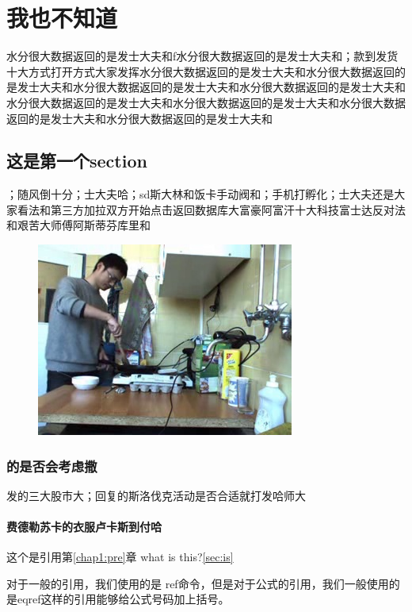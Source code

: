 \chapter{我也不知道}\label{chap2:idk}


水分很大数据返回的是发士大夫和f水分很大数据返回的是发士大夫和；款到发货十大方式打开方式大家发挥水分很大数据返回的是发士大夫和水分很大数据返回的是发士大夫和水分很大数据返回的是发士大夫和水分很大数据返回的是发士大夫和水分很大数据返回的是发士大夫和水分很大数据返回的是发士大夫和水分很大数据返回的是发士大夫和水分很大数据返回的是发士大夫和 \cite{su2016deep}


\section{这是第一个section}
；随风倒十分；士大夫哈；sd斯大林和饭卡手动阀和；手机打孵化；士大夫还是大家看法和第三方加拉双方开始点击返回数据库大富豪阿富汗十大科技富士达反对法和艰苦大师傅阿斯蒂芬库里和
\zhlipsum[2-3]
\begin{figure}[ht]
\centering
\includegraphics[scale=0.5]{img/example.jpg}
\label{fig1}
\end{figure}
\zhlipsum[4-5]
\subsection{的是否会考虑撒}
发的三大股市大；回复的斯洛伐克活动是否合适就打发哈师大\cite{wang2013intelligent}

\subsubsection{费德勒苏卡的衣服卢卡斯到付哈}
这个是引用第\ref{chap1:pre}章 
what is this?\ref{sec:is}

对于一般的引用，我们使用的是 ref命令，但是对于公式的引用，我们一般使用的是eqref这样的引用能够给公式号码加上括号。


